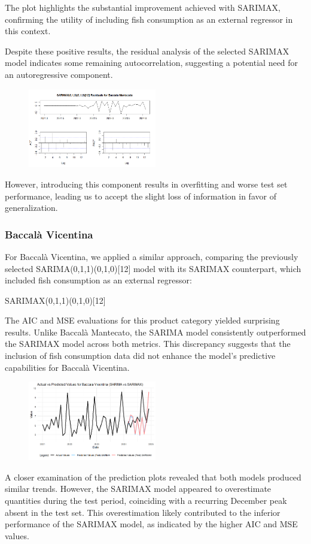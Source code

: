 \documentclass[10pt,twocolumn,letterpaper]{article}
\begin{document}
The plot highlights the substantial improvement achieved with SARIMAX, confirming the utility of including fish consumption as an external regressor in this context.

Despite these positive results, the residual analysis of the selected SARIMAX model indicates some remaining autocorrelation, suggesting a potential need for an autoregressive component. 
\begin{figure}[H]
    \centering
    \includegraphics[width=0.5\textwidth]{PlotsBEFD/ACF_SARIMAX_M.png} 
    \caption{}
    \label{fig:esempio}
\end{figure}
However, introducing this component results in overfitting and worse test set performance, leading us to accept the slight loss of information in favor of generalization.

\subsubsection{Baccalà Vicentina}

For Baccalà Vicentina, we applied a similar approach, comparing the previously selected SARIMA(0,1,1)(0,1,0)[12] model with its SARIMAX counterpart, which included fish consumption as an external regressor:

SARIMAX(0,1,1)(0,1,0)[12]

The AIC and MSE evaluations for this product category yielded surprising results. Unlike Baccalà Mantecato, the SARIMA model consistently outperformed the SARIMAX model across both metrics. This discrepancy suggests that the inclusion of fish consumption data did not enhance the model’s predictive capabilities for Baccalà Vicentina.
\begin{figure}[H]
    \centering
    \includegraphics[width=0.5\textwidth]{PlotsBEFD/V_COMPARE_SARIMAX_SARIMA_TEST_PRED.png} 
    \caption{}
    \label{fig:esempio}
\end{figure}
A closer examination of the prediction plots revealed that both models produced similar trends. However, the SARIMAX model appeared to overestimate quantities during the test period, coinciding with a recurring December peak absent in the test set. This overestimation likely contributed to the inferior performance of the SARIMAX model, as indicated by the higher AIC and MSE values.
\end{document}
